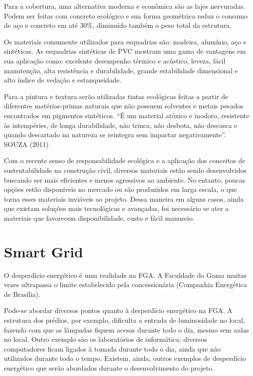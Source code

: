 Para a cobertura, uma alternativa moderna e econômica são as lajes nervuradas. Podem ser feitas com concreto ecológico e sua forma geométrica reduz o consumo de aço e concreto em até 30\%, diminuído também o peso total da estrutura.

Os materiais comumente utilizados para esquadrias são: madeira, alumínio, aço e sintéticas. As esquadrias sintéticas de PVC mostram uma gama de vantagens em sua aplicação como: excelente desempenho térmico e acústico, leveza, fácil manutenção, alta resistência e durabilidade, grande estabilidade dimensional e alto índice de vedação e estanqueidade.

Para a pintura e textura serão utilizadas tintas ecológicas feitas a partir de diferentes matérias-primas naturais que não possuem solventes e metais pesados encontrados em pigmentos sintéticos. “É um material atóxico e inodoro, resistente às intempéries, de longa durabilidade, não trinca, não desbota, não descasca e quando descartado na natureza se reintegra sem impactar negativamente”. SOUZA (2011)

Com o recente senso de responsabilidade ecológica e a aplicação dos conceitos de sustentabilidade na construção civil, diversos materiais estão sendo desenvolvidos buscando ser mais eficientes e menos agressivos ao ambiente. No entanto, poucas opções estão disponíveis no mercado ou são produzidos em larga escala, o que torna esses materiais inviáveis ao projeto. Dessa maneira em alguns casos, ainda que existam soluções mais tecnológicas e avançadas, foi necessário se ater a materiais que favorecem disponibilidade, custo e fácil manuseio.

\chapter[Smart Grid]{Smart Grid}

O desperdício energético é uma realidade na FGA. A Faculdade do Gama muitas vezes ultrapassa o limite estabelecido pela concessionária (Companhia Energética de Brasília).

Pode-se abordar diversos pontos quanto à desperdício energético na FGA. A estrutura dos prédios, por exemplo, dificulta a entrada de luminosidade no local, fazendo com que as lâmpadas fiquem acesas durante todo o dia, mesmo sem aulas no local. Outro exemplo são os laboratórios de informática: diversos computadores ficam ligados à tomada durante todo o dia, ainda que não utilizados durante todo o tempo. Existem, ainda, outros exemplos de desperdício energético que serão abordados durante o desenvolvimento do projeto.

